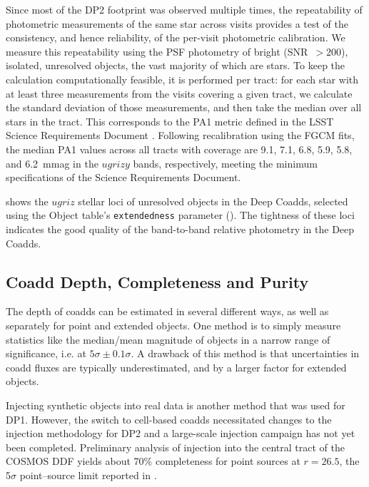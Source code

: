 Since most of the DP2 \gls{footprint} was observed multiple times, the repeatability of photometric measurements of the same star across visits provides a test of the consistency, and hence reliability, of the per-visit photometric calibration.
We measure this repeatability using the \gls{PSF} photometry of bright (SNR~$>200$), isolated, unresolved objects, the vast majority of which are stars.
To keep the calculation computationally feasible, it is performed per \gls{tract}: for each star with at least three measurements from the visits covering a given \gls{tract}, we calculate the standard deviation of those measurements, and then take the median over all stars in the \gls{tract}.
This corresponds to the PA1 metric defined in the LSST Science Requirements Document \citep[][]{LPM-17}.
Following recalibration using the \gls{FGCM} fits, the median PA1 values across all tracts with coverage are 9.1, 7.1, 6.8, 5.9, 5.8, and 6.2~mmag in the $ugrizy$ bands, respectively, meeting the minimum specifications of the Science Requirements \gls{Document}.

 shows the $ugriz$ stellar loci of unresolved objects in the Deep Coadds, selected using the \gls{Object} table's \texttt{extendedness} parameter ().
The tightness of these loci indicates the good quality of the band-to-band relative photometry in the Deep Coadds.

\subsection{Coadd Depth, Completeness and Purity}

The depth of coadds can be estimated in several different ways, as well as separately for point and extended objects.
One method is to simply measure statistics like the median/mean magnitude of objects in a narrow range of significance, i.e. at $5\sigma \pm 0.1\sigma$.
A drawback of this method is that uncertainties in coadd fluxes are typically underestimated, and by a larger factor for extended objects.

Injecting synthetic objects into real data is another method that was used for \gls{DP1}.
However, the switch to cell-based coadds necessitated changes to the injection methodology for \gls{DP2} and a large-scale injection campaign has not yet been completed.
Preliminary analysis of injection into the central tract of the \gls{COSMOS} \gls{DDF} yields about 70\% completeness for point sources at $r=26.5$, the 5$\sigma$ point--source limit reported in .

